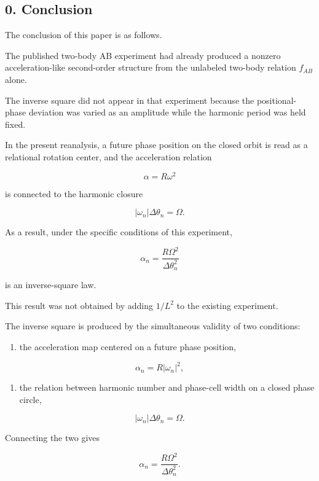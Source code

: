 \documentclass[
  10pt,
  a4paper,
]{article}
\providecommand{\tightlist}{%
  \setlength{\itemsep}{0pt}\setlength{\parskip}{0pt}}
\begin{document}
\subsection{0. Conclusion}\label{conclusion}

The conclusion of this paper is as follows.

The published two-body AB experiment had already produced a nonzero
acceleration-like second-order structure from the unlabeled two-body
relation \(f_{AB}\) alone.

The inverse square did not appear in that experiment because the
positional-phase deviation was varied as an amplitude while the harmonic
period was held fixed.

In the present reanalysis, a future phase position on the closed orbit
is read as a relational rotation center, and the acceleration relation

\[
\alpha=R\omega^2
\]

is connected to the harmonic closure

\[
|\omega_n|\Delta\theta_n=\Omega.
\]

As a result, under the specific conditions of this experiment,

\[
\alpha_n
=\frac{R\Omega^2}{\Delta\theta_n^2}
\]

is an inverse-square law.

This result was not obtained by adding \(1/L^2\) to the existing
experiment.

The inverse square is produced by the simultaneous validity of two
conditions:

\begin{enumerate}
\def\labelenumi{\arabic{enumi}.}
\tightlist
\item
  the acceleration map centered on a future phase position,
\end{enumerate}

\[
\alpha_n=R|\omega_n|^2,
\]

\begin{enumerate}
\def\labelenumi{\arabic{enumi}.}
\setcounter{enumi}{1}
\tightlist
\item
  the relation between harmonic number and phase-cell width on a closed
  phase circle,
\end{enumerate}

\[
|\omega_n|\Delta\theta_n=\Omega.
\]

Connecting the two gives

\[
\boxed{
\alpha_n
=\frac{R\Omega^2}{\Delta\theta_n^2}
}.
\]
\end{document}
